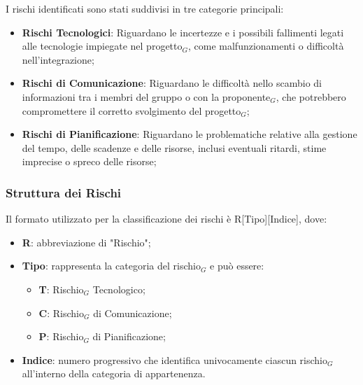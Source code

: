 \documentclass[10pt]{article}
\begin{document}
    I rischi identificati sono stati suddivisi in tre categorie principali:
    \begin{itemize}
        \item \textbf{Rischi Tecnologici}: Riguardano le incertezze e i possibili fallimenti legati alle tecnologie impiegate nel progetto$_G$, come malfunzionamenti o difficoltà nell'integrazione; 
        \item \textbf{Rischi di Comunicazione}: Riguardano le difficoltà nello scambio di informazioni tra i membri del gruppo o con la proponente$_G$, che potrebbero compromettere il corretto svolgimento del progetto$_G$;
        \item \textbf{Rischi di Pianificazione}: Riguardano le problematiche relative alla gestione del tempo, delle scadenze e delle risorse, inclusi eventuali ritardi, stime imprecise o spreco delle risorse;
    \end{itemize}

    \subsubsection{Struttura dei Rischi}
    Il formato utilizzato per la classificazione dei rischi è R[Tipo][Indice], dove:
    \begin{itemize}
        \item \textbf{R}: abbreviazione di "Rischio";
        \item \textbf{Tipo}: rappresenta la categoria del rischio$_G$ e può essere:
        \begin{itemize}
            \item \textbf{T}: Rischio$_G$ Tecnologico;
            \item \textbf{C}: Rischio$_G$ di Comunicazione;
            \item \textbf{P}: Rischio$_G$ di Pianificazione;
        \end{itemize}
        \item \textbf{Indice}: numero progressivo che identifica univocamente ciascun rischio$_G$ all'interno della categoria di appartenenza.
    \end{itemize}
\end{document}
